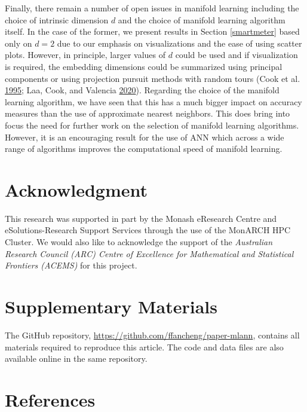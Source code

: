 \documentclass[12pt]{article}
\begin{document}
Finally, there remain a number of open issues in manifold learning including the choice of intrinsic dimension \(d\) and the choice of manifold learning algorithm itself. In the case of the former, we present results in Section \ref{smartmeter} based only on \(d=2\) due to our emphasis on visualizations and the ease of using scatter plots. However, in principle, larger values of \(d\) could be used and if visualization is required, the embedding dimensions could be summarized using principal components or using projection pursuit methods with random tours (Cook et al. \protect\hyperlink{ref-Cook1995}{1995}; Laa, Cook, and Valencia \protect\hyperlink{ref-Laa2020}{2020}). Regarding the choice of the manifold learning algorithm, we have seen that this has a much bigger impact on accuracy measures than the use of approximate nearest neighbors. This does bring into focus the need for further work on the selection of manifold learning algorithms. However, it is an encouraging result for the use of ANN which across a wide range of algorithms improves the computational speed of manifold learning.

\hypertarget{acknowledgment}{%
\section*{Acknowledgment}\label{acknowledgment}}

This research was supported in part by the Monash eResearch Centre and eSolutions-Research Support Services through the use of the MonARCH HPC Cluster.
We would also like to acknowledge the support of the \emph{Australian Research Council (ARC) Centre of Excellence for Mathematical and Statistical Frontiers (ACEMS)} for this project.

\clearpage

\hypertarget{supplementary-materials}{%
\section*{Supplementary Materials}\label{supplementary-materials}}

The GitHub repository, \url{https://github.com/ffancheng/paper-mlann}, contains all materials required to reproduce this article. The code and data files are also available online in the same repository.

\hypertarget{references}{%
\section*{References}\label{references}}
\end{document}
